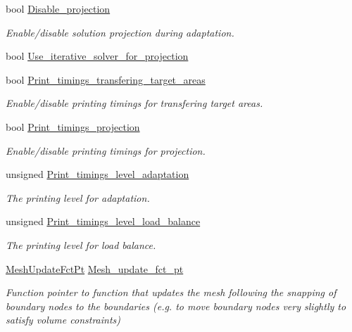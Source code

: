 \begin{DoxyCompactItemize}
bool \hyperlink{classoomph_1_1RefineableTriangleMesh_a7825ce22a479fecd30361ae09750f15a}{Disable\+\_\+projection}
\begin{DoxyCompactList}\small\item\em Enable/disable solution projection during adaptation. \end{DoxyCompactList}\item 
bool \hyperlink{classoomph_1_1RefineableTriangleMesh_a6b38d79f86053e7acb8f92efe06d9c9a}{Use\+\_\+iterative\+\_\+solver\+\_\+for\+\_\+projection}
\item 
bool \hyperlink{classoomph_1_1RefineableTriangleMesh_acd5c63891d8a4052ce629610697561b6}{Print\+\_\+timings\+\_\+transfering\+\_\+target\+\_\+areas}
\begin{DoxyCompactList}\small\item\em Enable/disable printing timings for transfering target areas. \end{DoxyCompactList}\item 
bool \hyperlink{classoomph_1_1RefineableTriangleMesh_ac0e10dae151eb6c03f90be0bc3462f8d}{Print\+\_\+timings\+\_\+projection}
\begin{DoxyCompactList}\small\item\em Enable/disable printing timings for projection. \end{DoxyCompactList}\item 
unsigned \hyperlink{classoomph_1_1RefineableTriangleMesh_a0b8c7af317c5279a00a13aa39ea896f2}{Print\+\_\+timings\+\_\+level\+\_\+adaptation}
\begin{DoxyCompactList}\small\item\em The printing level for adaptation. \end{DoxyCompactList}\item 
unsigned \hyperlink{classoomph_1_1RefineableTriangleMesh_ad2abc4d856b22d59ecc5640669700b31}{Print\+\_\+timings\+\_\+level\+\_\+load\+\_\+balance}
\begin{DoxyCompactList}\small\item\em The printing level for load balance. \end{DoxyCompactList}\item 
\hyperlink{classoomph_1_1RefineableTriangleMesh_aa78ffa56b66a1371aec25e25f7aaff9e}{Mesh\+Update\+Fct\+Pt} \hyperlink{classoomph_1_1RefineableTriangleMesh_a4fbf41991a5b25054d43d6cd9af599a8}{Mesh\+\_\+update\+\_\+fct\+\_\+pt}
\begin{DoxyCompactList}\small\item\em Function pointer to function that updates the mesh following the snapping of boundary nodes to the boundaries (e.\+g. to move boundary nodes very slightly to satisfy volume constraints) \end{DoxyCompactList}\item 

\end{DoxyCompactItemize}
